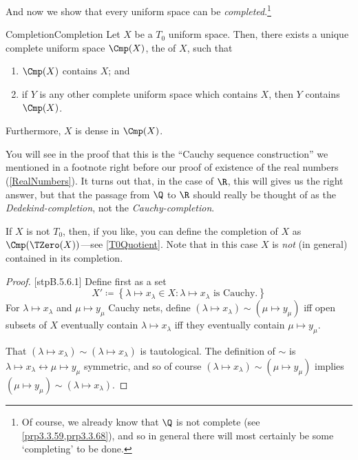 And now we show that every uniform space can be \emph{completed}.\footnote{Of course, we already know that $\Q$ is not complete (see \cref{prp3.3.59,prp3.3.68}), and so in general there will most certainly be some `completing' to be done.}
\begin{thm}{Completion}{Completion}
Let $X$ be a $T_0$ uniform space.  Then, there exists a unique complete uniform space $\Cmp (X)$, the  of $X$, such that
\begin{enumerate}
\item $\Cmp (X)$ contains $X$; and
\item if $Y$ is any other complete uniform space which contains $X$, then $Y$ contains $\Cmp (X)$.
\end{enumerate}
Furthermore, $X$ is dense in $\Cmp (X)$.
\begin{rmk}
You will see in the proof that this is the ``Cauchy sequence construction'' we mentioned in a footnote right before our proof of existence of the real numbers (\cref{RealNumbers}).  It turns out that, in the case of $\R$, this will gives us the right answer, but that the passage from $\Q$ to $\R$ should really be thought of as the \emph{Dedekind-completion}, not the \emph{Cauchy-completion}.
\end{rmk}
\begin{rmk}
If $X$ is not $T_0$, then, if you like, you can define the completion of $X$ as $\Cmp (\TZero (X))$---see \cref{T0Quotient}.  Note that in this case $X$ is \emph{not} (in general) contained in its completion.
\end{rmk}
\begin{proof}
[stpB.5.6.1]
Define first as a set
\begin{equation}
X'\coloneqq \left\{ \lambda \mapsto x_\lambda \in X:\lambda \mapsto x_\lambda \text{ is Cauchy.}\right\} 
\end{equation}
For $\lambda \mapsto x_\lambda$ and $\mu \mapsto y_\mu$ Cauchy nets, define $(\lambda \mapsto x_\lambda )\sim (\mu \mapsto y_\mu )$ iff open subsets of $X$ eventually contain $\lambda \mapsto x_\lambda$ iff they eventually contain $\mu \mapsto y_\mu$.

That $(\lambda \mapsto x_\lambda )\sim (\lambda \mapsto x_\lambda )$ is tautological.  The definition of $\sim$ is $\lambda \mapsto x_\lambda \leftrightarrow \mu \mapsto y_\mu$ symmetric, and so of course $(\lambda \mapsto x_\lambda )\sim (\mu \mapsto y_\mu )$ implies $(\mu \mapsto y_\mu )\sim (\lambda \mapsto x_\lambda )$.


\end{proof}
\end{thm}
